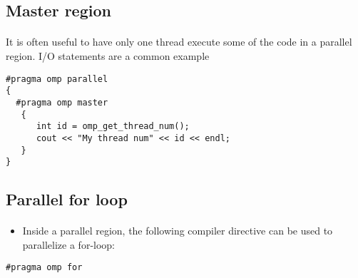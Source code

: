 \documentclass[%
oneside,                 %
final,                   %
10pt]{article}
\begin{document}
\subsection*{Master region}

\paragraph{}
It is often useful to have only one thread execute some of the code in a parallel region. I/O statements are a common example









\begin{verbatim}
#pragma omp parallel 
{
  #pragma omp master
   {
      int id = omp_get_thread_num();
      cout << "My thread num" << id << endl; 
   } 
}

\end{verbatim}



\subsection*{Parallel for loop}

\paragraph{}
\begin{itemize}
 \item Inside a parallel region, the following compiler directive can be used to parallelize a for-loop:
\end{itemize}

\noindent


\begin{verbatim}
#pragma omp for

\end{verbatim}
\end{document}

